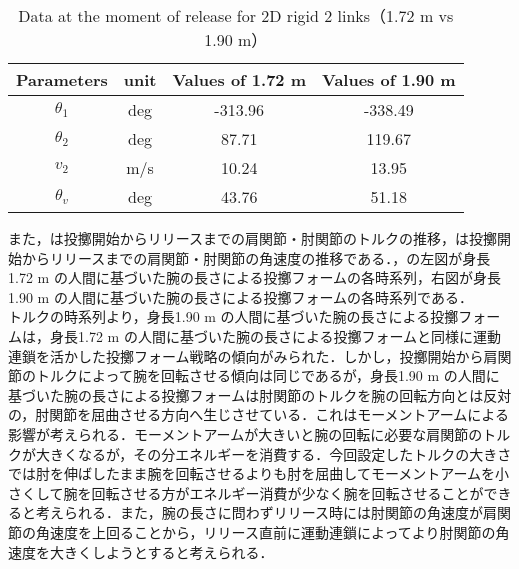 \begin{table}[tb]
  \begin{center}
    \caption{Data at the moment of release for 2D rigid 2 links（1.72 m vs 1.90 m）}
    \begin{tabular}{c|c|c|c}
      \hline
      Parameters & unit & Values of 1.72 m & Values of 1.90 m \\
      \hline
      $\theta_{1}$ & deg & -313.96 & -338.49 \\
      $\theta_{2}$ & deg & 87.71 & 119.67 \\
      $v_{2}$ & m/s & 10.24 & 13.95 \\
      $\theta_{v}$ & deg & 43.76 & 51.18 \\
      \hline
    \end{tabular}
  \end{center}
\end{table}

また，は投擲開始からリリースまでの肩関節・肘関節のトルクの推移，は投擲開始からリリースまでの肩関節・肘関節の角速度の推移である．，の左図が身長1.72 m の人間に基づいた腕の長さによる投擲フォームの各時系列，右図が身長1.90 m の人間に基づいた腕の長さによる投擲フォームの各時系列である．\\
トルクの時系列より，身長1.90 m の人間に基づいた腕の長さによる投擲フォームは，身長1.72 m の人間に基づいた腕の長さによる投擲フォームと同様に運動連鎖を活かした投擲フォーム戦略の傾向がみられた．しかし，投擲開始から肩関節のトルクによって腕を回転させる傾向は同じであるが，身長1.90 m の人間に基づいた腕の長さによる投擲フォームは肘関節のトルクを腕の回転方向とは反対の，肘関節を屈曲させる方向へ生じさせている．これはモーメントアームによる影響が考えられる．モーメントアームが大きいと腕の回転に必要な肩関節のトルクが大きくなるが，その分エネルギーを消費する．今回設定したトルクの大きさでは肘を伸ばしたまま腕を回転させるよりも肘を屈曲してモーメントアームを小さくして腕を回転させる方がエネルギー消費が少なく腕を回転させることができると考えられる．また，腕の長さに問わずリリース時には肘関節の角速度が肩関節の角速度を上回ることから，リリース直前に運動連鎖によってより肘関節の角速度を大きくしようとすると考えられる．

\clearpage
{}

